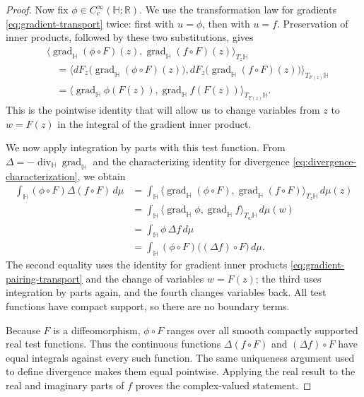 \begin{proof}
Now fix $\phi\in C_c^\infty(\mathbb H;\mathbb R)$. We use the transformation law for gradients \eqref{eq:gradient-transport} twice: first with $u=\phi$, then with $u=f$. Preservation of inner products, followed by these two substitutions, gives
\begin{equation}\label{eq:gradient-pairing-transport}
 \begin{aligned}
 &\langle\operatorname{grad}_{\mathbb H}(\phi\circ F)(z),
          \operatorname{grad}_{\mathbb H}(f\circ F)(z)\rangle_{T_z\mathbb H}\\
 &\quad=\bigl\langle dF_z\bigl(\operatorname{grad}_{\mathbb H}(\phi\circ F)(z)\bigr),
                    dF_z\bigl(\operatorname{grad}_{\mathbb H}(f\circ F)(z)\bigr)
          \bigr\rangle_{T_{F(z)}\mathbb H}\\
 &\quad=\langle\operatorname{grad}_{\mathbb H}\phi(F(z)),
                \operatorname{grad}_{\mathbb H}f(F(z))\rangle_{T_{F(z)}\mathbb H}.
 \end{aligned}
\end{equation}
This is the pointwise identity that will allow us to change variables from $z$ to $w=F(z)$ in the integral of the gradient inner product.

We now apply integration by parts with this test function. From $\Delta=-\operatorname{div}_{\mathbb H}\operatorname{grad}_{\mathbb H}$ and the characterizing identity for divergence \eqref{eq:divergence-characterization}, we obtain
\[
 \begin{aligned}
 \int_{\mathbb H}(\phi\circ F)\Delta(f\circ F)\,d\mu
 &=\int_{\mathbb H}
   \langle\operatorname{grad}_{\mathbb H}(\phi\circ F),
          \operatorname{grad}_{\mathbb H}(f\circ F)\rangle_{T_z\mathbb H}\,d\mu(z)\\
 &=\int_{\mathbb H}
   \langle\operatorname{grad}_{\mathbb H}\phi,
          \operatorname{grad}_{\mathbb H}f\rangle_{T_w\mathbb H}\,d\mu(w)\\
 &=\int_{\mathbb H}\phi\,\Delta f\,d\mu\\
 &=\int_{\mathbb H}(\phi\circ F)\bigl((\Delta f)\circ F\bigr)\,d\mu.
 \end{aligned}
\]
The second equality uses the identity for gradient inner products \eqref{eq:gradient-pairing-transport} and the change of variables $w=F(z)$; the third uses integration by parts again, and the fourth changes variables back. All test functions have compact support, so there are no boundary terms.

Because $F$ is a diffeomorphism, $\phi\circ F$ ranges over all smooth compactly supported real test functions. Thus the continuous functions $\Delta(f\circ F)$ and $(\Delta f)\circ F$ have equal integrals against every such function. The same uniqueness argument used to define divergence makes them equal pointwise. Applying the real result to the real and imaginary parts of $f$ proves the complex-valued statement.
\end{proof}

